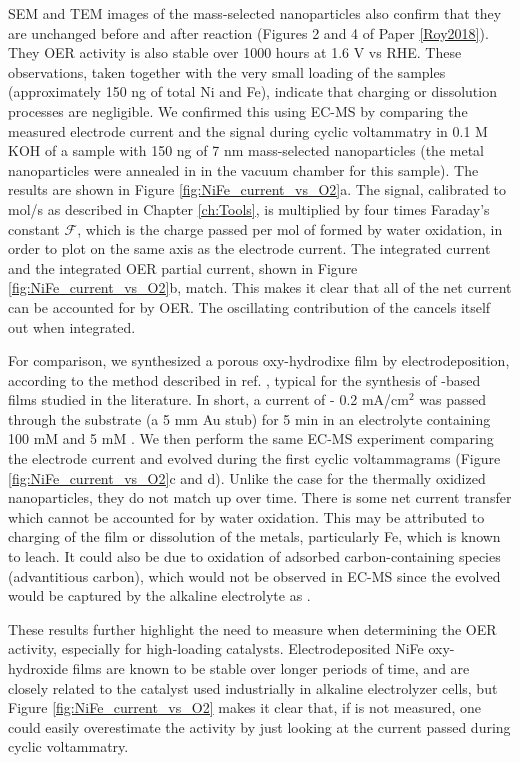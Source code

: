 SEM and TEM images of the mass-selected nanoparticles also confirm that they are unchanged before and after reaction (Figures 2 and 4 of Paper \ref{Roy2018}). They OER activity is also stable over 1000 hours at 1.6 V vs RHE. These observations, taken together with the very small loading of the samples (approximately 150 ng of total Ni and Fe), indicate that charging or dissolution processes are negligible. We confirmed this using EC-MS by comparing the measured electrode current and the  signal during cyclic voltammatry in 0.1 M KOH of a sample with 150 ng of 7 nm mass-selected  nanoparticles (the metal nanoparticles were annealed in  in the vacuum chamber for this sample). The results are shown in Figure \ref{fig:NiFe_current_vs_O2}a. The  signal, calibrated to mol/s as described in Chapter \ref{ch:Tools}, is multiplied by four times Faraday's constant $\mathcal{F}$, which is the charge passed per mol of  formed by water oxidation, in order to plot on the same axis as the electrode current. The integrated current and the integrated OER partial current, shown in Figure \ref{fig:NiFe_current_vs_O2}b, match. This makes it clear that all of the net current can be accounted for by OER. The oscillating contribution of the  cancels itself out when integrated.

For comparison, we synthesized a porous  oxy-hydrodixe film by electrodeposition, according to the method described in ref. , typical for the synthesis of -based films studied in the literature\cite{Dionigi2016b}. In short, a current of - ​0.2 mA/cm$^2$ was passed through the substrate (a 5 mm Au stub) for 5 min in an electrolyte containing 100 mM  and 5 mM . We then perform the same EC-MS experiment comparing the electrode current and evolved  during the first cyclic voltammagrams (Figure \ref{fig:NiFe_current_vs_O2}c and d). Unlike the case for the thermally oxidized nanoparticles, they do not match up over time. There is some net current transfer which cannot be accounted for by water oxidation. This may be attributed to charging of the film or dissolution of the metals, particularly Fe, which is known to leach. It could also be due to oxidation of adsorbed carbon-containing species (advantitious carbon), which would not be observed in EC-MS since the evolved  would be captured by the alkaline electrolyte as .

These results further highlight the need to measure  when determining the OER activity, especially for high-loading catalysts. Electrodeposited NiFe oxy-hydroxide films are known to be stable over longer periods of time, and are closely related to the catalyst used industrially in alkaline electrolyzer cells, but Figure \ref{fig:NiFe_current_vs_O2} makes it clear that, if  is not measured, one could easily overestimate the activity by just looking at the current passed during cyclic voltammatry.